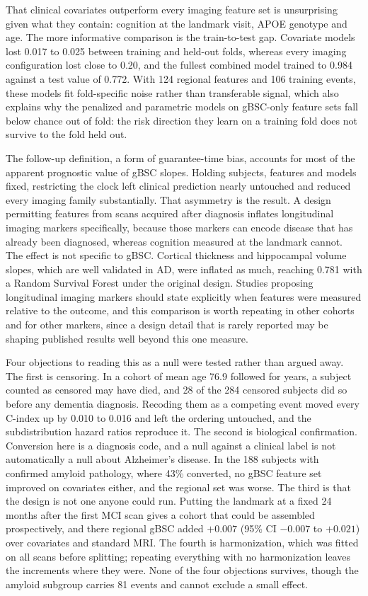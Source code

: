\documentclass[blue]{ludusofficial}  %
\begin{document}
That clinical covariates outperform every imaging feature set is unsurprising given what they contain: cognition at the landmark visit, APOE genotype and age. The more informative comparison is the train-to-test gap. Covariate models lost 0.017 to 0.025 between training and held-out folds, whereas every imaging configuration lost close to 0.20, and the fullest combined model trained to 0.984 against a test value of 0.772. With 124 regional features and 106 training events, these models fit fold-specific noise rather than transferable signal, which also explains why the penalized and parametric models on gBSC-only feature sets fall below chance out of fold: the risk direction they learn on a training fold does not survive to the fold held out.

The follow-up definition, a form of guarantee-time bias, accounts for most of the apparent prognostic value of gBSC slopes. Holding subjects, features and models fixed, restricting the clock left clinical prediction nearly untouched and reduced every imaging family substantially. That asymmetry is the result. A design permitting features from scans acquired after diagnosis inflates longitudinal imaging markers specifically, because those markers can encode disease that has already been diagnosed, whereas cognition measured at the landmark cannot. The effect is not specific to gBSC. Cortical thickness and hippocampal volume slopes, which are well validated in AD, were inflated as much, reaching 0.781 with a Random Survival Forest under the original design. Studies proposing longitudinal imaging markers should state explicitly when features were measured relative to the outcome, and this comparison is worth repeating in other cohorts and for other markers, since a design detail that is rarely reported may be shaping published results well beyond this one measure.

Four objections to reading this as a null were tested rather than argued away. The first is censoring. In a cohort of mean age 76.9 followed for years, a subject counted as censored may have died, and 28 of the 284 censored subjects did so before any dementia diagnosis. Recoding them as a competing event moved every C-index up by 0.010 to 0.016 and left the ordering untouched, and the subdistribution hazard ratios reproduce it. The second is biological confirmation. Conversion here is a diagnosis code, and a null against a clinical label is not automatically a null about Alzheimer's disease. In the 188 subjects with confirmed amyloid pathology, where 43\% converted, no gBSC feature set improved on covariates either, and the regional set was worse. The third is that the design is not one anyone could run. Putting the landmark at a fixed 24 months after the first MCI scan gives a cohort that could be assembled prospectively, and there regional gBSC added $+0.007$ (95\% CI $-0.007$ to $+0.021$) over covariates and standard MRI. The fourth is harmonization, which was fitted on all scans before splitting; repeating everything with no harmonization leaves the increments where they were. None of the four objections survives, though the amyloid subgroup carries 81 events and cannot exclude a small effect.
\end{document}
